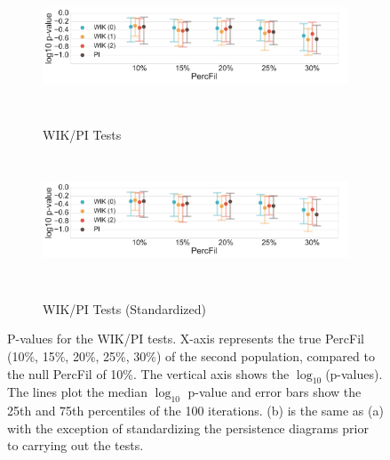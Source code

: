 \documentclass[12pt]{article}
\begin{document}
\begin{figure}[htp!]
  \centering
  \begin{subfigure}{.9\textwidth}
    \centering
    \caption{WIK/PI Tests}
    \includegraphics[width=\linewidth, height = 1.5in]{figure_8_weighted_contour_group.pdf}
    \label{fig:sub_weight}
  \end{subfigure}
  \begin{subfigure}{.9\textwidth}
    \centering
    \caption{WIK/PI Tests (Standardized)}
    \includegraphics[width=\linewidth, height = 1.5in]{figure_8_weighted_contour_group_normed.pdf}
    \label{fig:sub_weight_normed}
  \end{subfigure}
\label{fig:sub_weight_results}
\caption{P-values for the WIK/PI tests. X-axis represents the true PercFil (10\%, 15\%, 20\%, 25\%, 30\%) of the second population, compared to the null PercFil of 10\%.
The vertical axis shows the $\log_{10}$(p-values). The lines plot the median $\log_{10}$ p-value and error bars show the 25th and 75th percentiles of the 100 iterations. (b) is the same as (a) with the exception of standardizing the persistence diagrams prior to carrying out the tests. }
\end{figure}
\end{document}
